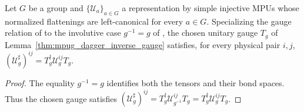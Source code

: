 \begin{lemma}
    \label{thm:mpug_involutive_adjoint_gauge}
    \leanok
    Let $G$ be a group and $\{\mathcal U_a\}_{a\in G}$ a representation
    by simple injective MPUs whose normalized flattenings are left-canonical
    for every $a\in G$. Specializing the gauge relation of
    \cite[lines~1552--1557]{FrancoRubio2025MPUGauging} to the involutive case
    $g^{-1}=g$ of \cite[lines~1933--1955]{FrancoRubio2025MPUGauging}, the
    chosen unitary gauge $T_g$ of Lemma~\ref{thm:mpug_dagger_inverse_gauge}
    satisfies, for every physical pair $i,j$,
    $(\mathcal U_g^\sharp)^{ij}=T_g^\dagger\mathcal U_g^{ij}T_g$.
\end{lemma}
\begin{proof}\leanok
    The equality $g^{-1}=g$ identifies both the tensors and their bond
    spaces. Thus the chosen gauge satisfies
    $(\mathcal U_g^\sharp)^{ij}
        =T_g^\dagger\mathcal U_{g^{-1}}^{ij}T_g
        =T_g^\dagger\mathcal U_g^{ij}T_g$.
\end{proof}

